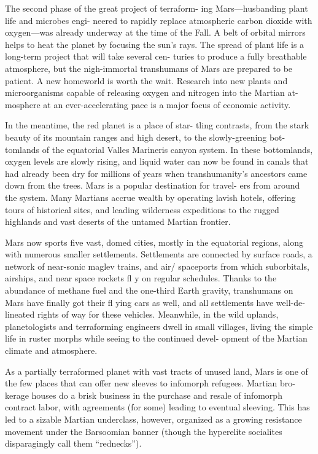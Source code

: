 The second phase of the great project of terraform-
ing Mars—husbanding plant life and microbes engi-
neered to rapidly replace atmospheric carbon dioxide 
with oxygen—was already underway at the time of 
the Fall. A belt of orbital mirrors helps to heat the 
planet by focusing the sun's rays. The spread of plant 
life is a long-term project that will take several cen-
turies to produce a fully breathable atmosphere, but 
the nigh-immortal transhumans of Mars are prepared 
to be patient. A new homeworld is worth the wait. 
Research into new plants and microorganisms capable 
of releasing oxygen and nitrogen into the Martian at-
mosphere at an ever-accelerating pace is a major focus 
of economic activity.

In the meantime, the red planet is a place of star-
tling contrasts, from the stark beauty of its mountain 
ranges and high desert, to the slowly-greening bot-
tomlands of the equatorial Valles Marineris canyon 
system. In these bottomlands, oxygen levels are 
slowly rising, and liquid water can now be found in 
canals that had already been dry for millions of years 
when transhumanity's ancestors came down from 
the trees. Mars is a popular destination for travel-
ers from around the system. Many Martians accrue 
wealth by operating lavish hotels, offering tours of 
historical sites, and leading wilderness expeditions to 
the rugged highlands and vast deserts of the untamed 
Martian frontier.

Mars now sports five vast, domed cities, mostly in 
the equatorial regions, along with numerous smaller 
settlements. Settlements are connected by surface 
roads, a network of near-sonic maglev trains, and air/
spaceports from which suborbitals, airships, and near 
space rockets fl y on regular schedules. Thanks to the 
abundance of methane fuel and the one-third Earth 
gravity, transhumans on Mars have finally got their 
fl ying cars as well, and all settlements have well-de-
lineated rights of way for these vehicles. Meanwhile, 
in the wild uplands, planetologists and terraforming 
engineers dwell in small villages, living the simple life 
in ruster morphs while seeing to the continued devel-
opment of the Martian climate and atmosphere.

As a partially terraformed planet with vast tracts of 
unused land, Mars is one of the few places that can 
offer new sleeves to infomorph refugees. Martian bro-
kerage houses do a brisk business in the purchase and 
resale of infomorph contract labor, with agreements 
(for some) leading to eventual sleeving. This has led to 
a sizable Martian underclass, however, organized as a 
growing resistance movement under the Barsoomian 
banner (though the hyperelite socialites disparagingly 
call them ``rednecks'').

